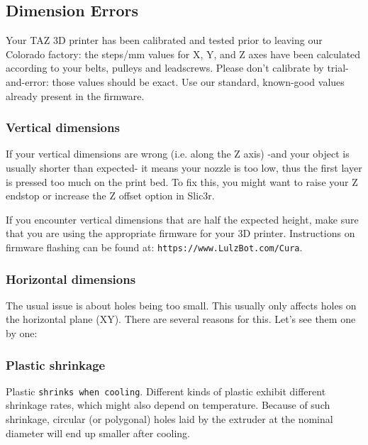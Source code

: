 
\subsection{Dimension Errors}
\label{sec:dimension_errors}

Your TAZ 3D printer has been calibrated and tested prior to leaving our Colorado factory: the steps/mm values for X, Y, and Z axes have been calculated according to your belts, pulleys and leadscrews. Please don't calibrate by trial-and-error: those values should be exact. Use our standard, known-good values already present in the firmware.

\subsubsection{Vertical dimensions}

If your vertical dimensions are wrong (i.e. along the Z axis) -and your object is usually shorter than expected- it means your nozzle is too low, thus the first layer is pressed too much on the print bed. To fix this, you might want to raise your Z endstop or increase the Z offset option in Slic3r.

If you encounter vertical dimensions that are half the expected height, make sure that you are using the appropriate firmware for your 3D printer. Instructions on firmware flashing can be found at: \texttt{https://www.LulzBot.com/Cura}.

\subsubsection{Horizontal dimensions}

The usual issue is about holes being too small. This usually only affects holes on the horizontal plane (XY). There are several reasons for this. Let's see them one by one:

\subsubsection{Plastic shrinkage}

Plastic \texttt{shrinks when cooling}. Different kinds of plastic exhibit different shrinkage rates, which might also depend on temperature. Because of such shrinkage, circular (or polygonal) holes laid by the extruder at the nominal diameter will end up smaller after cooling.

